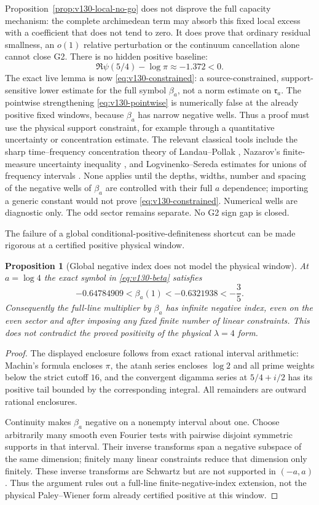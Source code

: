 \documentclass[11pt]{article}
\newtheorem{proposition}[theorem]{Proposition}
\theoremstyle{remark}
\begin{document}
Proposition~\ref{prop:v130-local-no-go} does not disprove the full
capacity mechanism: the complete archimedean term may absorb this
fixed local excess with a coefficient that does not tend to zero.
It does prove that ordinary residual smallness, an $o(1)$ relative
perturbation or the continuum cancellation alone cannot close G2.
There is no hidden positive baseline:
\[
 \Re\psi(5/4)-\log\pi\approx-1.372<0.
\]
The exact live lemma is now \eqref{eq:v130-constrained}: a
source-constrained, support-sensitive lower estimate for the full
symbol $\beta_a$, not a norm estimate on $\mathfrak r_a$. The
pointwise strengthening \eqref{eq:v130-pointwise} is numerically false
at the already positive fixed windows, because $\beta_a$ has narrow
negative wells. Thus a proof must use the physical support constraint,
for example through a quantitative uncertainty or concentration
estimate. The relevant classical tools include the sharp
time--frequency concentration theory of Landau--Pollak
\cite{LandauPollak1961}, Nazarov's finite-measure uncertainty
inequality \cite{Nazarov1994}, and Logvinenko--Sereda estimates for
unions of frequency intervals \cite{Kovrijkine2000}. None applies
until the depths, widths, number and spacing of the negative wells of
$\beta_a$ are controlled with their full $a$ dependence; importing a
generic constant would not prove \eqref{eq:v130-constrained}.
Numerical wells are diagnostic only. The odd sector remains separate.
No G2 sign gap is closed.

The failure of a global conditional-positive-definiteness shortcut can
be made rigorous at a certified positive physical window.

\begin{proposition}[Global negative index does not model the physical window]
\label{prop:v132-global-index}
At $a=\log4$ the exact symbol in \eqref{eq:v130-beta} satisfies
\[
 -0.64784909<\beta_a(1)<-0.6321938<-\frac35.
\]
Consequently the full-line multiplier by $\beta_a$ has infinite
negative index, even on the even sector and after imposing any fixed
finite number of linear constraints. This does not contradict the
proved positivity of the physical $\lambda=4$ form.
\end{proposition}
\begin{proof}
The displayed enclosure follows from exact rational interval
arithmetic: Machin's formula encloses $\pi$, the atanh series encloses
$\log2$ and all prime weights below the strict cutoff $16$, and the
convergent digamma series at $5/4+i/2$ has its positive tail bounded by
the corresponding integral. All remainders are outward rational
enclosures.

Continuity makes $\beta_a$ negative on a nonempty interval about one.
Choose arbitrarily many smooth even Fourier tests with pairwise
disjoint symmetric supports in that interval. Their inverse transforms
span a negative subspace of the same dimension; finitely many linear
constraints reduce that dimension only finitely. These inverse
transforms are Schwartz but are not supported in $(-a,a)$. Thus the
argument rules out a full-line finite-negative-index extension, not the
physical Paley--Wiener form already certified positive at this window.
\end{proof}
\end{document}
